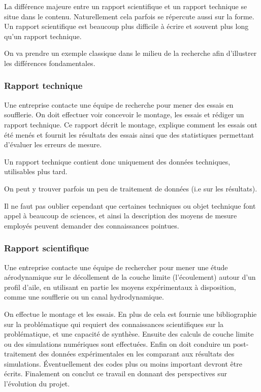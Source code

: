 La différence majeure entre un rapport scientifique et un rapport technique 
se situe dans le contenu.
 Naturellement cela parfois se répercute  aussi sur la forme. 
 Un rapport scientifique est beaucoup plus difficile à écrire et souvent plus long qu'un rapport technique.

On va prendre un exemple classique dans le milieu de la recherche afin d'illustrer les différences fondamentales.

\subsubsection{Rapport technique}

Une entreprise contacte une équipe de recherche  pour mener des essais en soufflerie. 
On doit effectuer voir concevoir le montage,  les essais et rédiger un rapport technique.
Ce rapport décrit le montage, explique comment les essais ont été menés et fournit les résultats des essais 
ainsi que des statistiques permettant d'évaluer les erreurs de mesure.

Un rapport technique contient donc uniquement des données techniques, utilisables plus tard. 

On peut y trouver parfois un peu de traitement de données (i.e sur les résultats).

Il ne faut pas oublier cependant que certaines techniques ou objet technique 
font appel à beaucoup de sciences, et ainsi la description des moyens de mesure employés peuvent
demander des connaissances pointues. 


\subsubsection{Rapport scientifique}

Une entreprise contacte une équipe de rechercher 
pour mener une étude aérodynamique sur le décollement de la couche limite (l'écoulement) autour d'un profil d'aile, en utilisant en partie les moyens
expérimentaux à disposition, comme une soufflerie ou un canal hydrodynamique.

On effectue le montage et les essais.
 En plus de cela est fournie  une bibliographie sur la problématique qui requiert des connaissances scientifiques sur la problématique, et une capacité de synthèse.
  Ensuite  des calculs de couche limite ou des simulations numériques sont effectuées.
  Enfin on doit conduire un post-traitement des données expérimentales en les comparant aux résultats des simulations.
 \'Eventuellement des codes plus ou moins important devront être écrits.   
   Finalement on conclut ce travail en donnant des perspectives sur l'évolution du projet.

